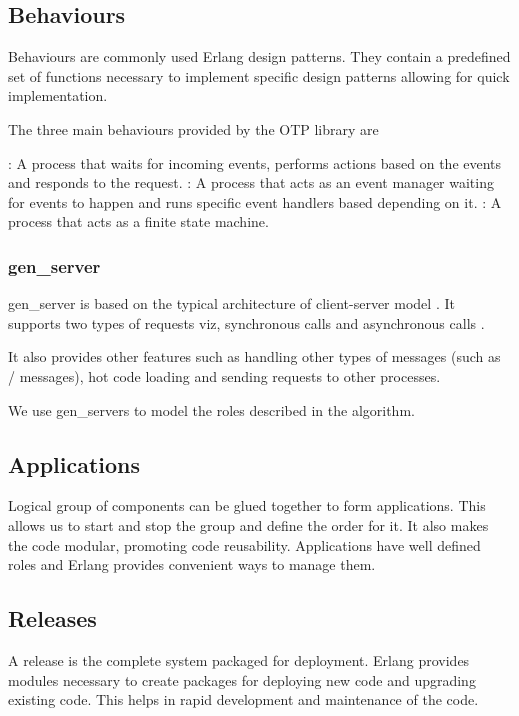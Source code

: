 \subsection{Behaviours}
\label{section:concepts.behaviours}
Behaviours are commonly used Erlang design patterns. They contain a predefined
set of functions necessary to implement specific design patterns allowing for
quick implementation.

The three main behaviours provided by the OTP library are

\begin{itemize}
    : A process that waits for incoming events, performs
    actions based on the events and responds to the request.
    : A process that acts as an event manager waiting for
    events to happen and runs specific event handlers based depending on it.
    : A process that acts as a finite state machine.
\end{itemize}

\subsubsection{gen\_server}
\label{section:gen.server}

gen\_server is based on the typical architecture of client-server model
\citep{reliable.dist.sys}. It supports two types of requests viz, synchronous
calls%
and asynchronous calls%
.

It also provides other features such as handling other types of messages (such
as / messages), hot code loading and sending requests to
other processes.

We use gen\_servers to model the roles described in the algorithm.

\subsection{Applications}
\label{section:concepts.applications}
Logical group of components can be glued together to form applications.
This allows us to start and stop the group and define the order for it. It also
makes the code modular, promoting code reusability. Applications have
well defined roles and Erlang provides convenient ways to
manage them.

\subsection{Releases}
\label{section:concepts.releases}
A release is the complete system packaged for deployment. Erlang provides
modules necessary to create packages for deploying new code and upgrading
existing code. This helps in rapid development and maintenance of the code.

